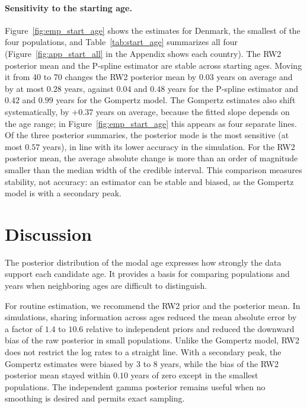 \documentclass[12pt, letterpaper]{article}
\begin{document}
\paragraph{Sensitivity to the starting age.} Figure~\ref{fig:emp_start_age} shows the estimates for Denmark, the smallest of the four populations, and Table~\ref{tab:start_age} summarizes all four (Figure~\ref{fig:app_start_all} in the Appendix shows each country). The RW2 posterior mean and the P-spline estimator are stable across starting ages. Moving it from 40 to 70 changes the RW2 posterior mean by $0.03$ years on average and by at most $0.28$ years, against $0.04$ and $0.48$ years for the P-spline estimator and $0.42$ and $0.99$ years for the Gompertz model. The Gompertz estimates also shift systematically, by $+0.37$ years on average, because the fitted slope depends on the age range; in Figure~\ref{fig:emp_start_age} this appears as four separate lines. Of the three posterior summaries, the posterior mode is the most sensitive (at most $0.57$ years), in line with its lower accuracy in the simulation. For the RW2 posterior mean, the average absolute change is more than an order of magnitude smaller than the median width of the credible interval. This comparison measures stability, not accuracy: an estimator can be stable and biased, as the Gompertz model is with a secondary peak.



\section{Discussion}
\label{sec:conclusion}

The posterior distribution of the modal age expresses how strongly the data support each candidate age. It provides a basis for comparing populations and years when neighboring ages are difficult to distinguish.

For routine estimation, we recommend the RW2 prior and the posterior mean. In simulations, sharing information across ages reduced the mean absolute error by a factor of $1.4$ to $10.6$ relative to independent priors and reduced the downward bias of the raw posterior in small populations. Unlike the Gompertz model, RW2 does not restrict the log rates to a straight line. With a secondary peak, the Gompertz estimates were biased by 3 to 8 years, while the bias of the RW2 posterior mean stayed within $0.10$ years of zero except in the smallest populations. The independent gamma posterior remains useful when no smoothing is desired and permits exact sampling.
\end{document}
